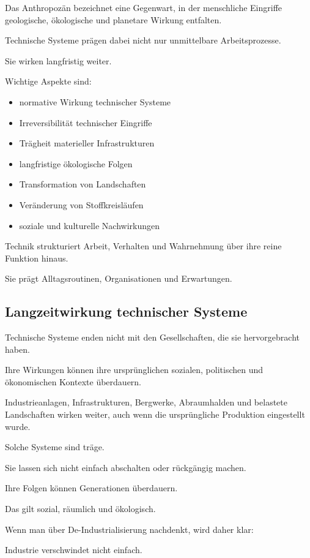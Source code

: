 Das Anthropozän bezeichnet eine Gegenwart,
in der menschliche Eingriffe
geologische,
ökologische
und planetare Wirkung entfalten.

Technische Systeme prägen dabei
nicht nur unmittelbare Arbeitsprozesse.

Sie wirken langfristig weiter.

Wichtige Aspekte sind:

\begin{itemize}
\item normative Wirkung technischer Systeme
\item Irreversibilität technischer Eingriffe
\item Trägheit materieller Infrastrukturen
\item langfristige ökologische Folgen
\item Transformation von Landschaften
\item Veränderung von Stoffkreisläufen
\item soziale und kulturelle Nachwirkungen
\end{itemize}

Technik strukturiert Arbeit,
Verhalten
und Wahrnehmung
über ihre reine Funktion hinaus.

Sie prägt Alltagsroutinen,
Organisationen
und Erwartungen.

\subsection{Langzeitwirkung technischer Systeme}

Technische Systeme enden nicht
mit den Gesellschaften,
die sie hervorgebracht haben.

Ihre Wirkungen können ihre ursprünglichen
sozialen,
politischen
und ökonomischen Kontexte überdauern.

Industrieanlagen,
Infrastrukturen,
Bergwerke,
Abraumhalden
und belastete Landschaften
wirken weiter,
auch wenn die ursprüngliche Produktion
eingestellt wurde.

Solche Systeme sind träge.

Sie lassen sich nicht einfach abschalten
oder rückgängig machen.

Ihre Folgen können Generationen überdauern.

Das gilt sozial,
räumlich
und ökologisch.

Wenn man über De-Industrialisierung nachdenkt,
wird daher klar:

Industrie verschwindet nicht einfach.

